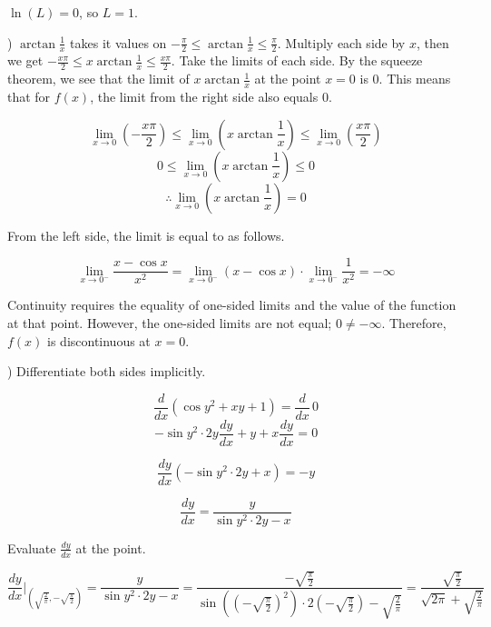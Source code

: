 \documentclass{article}
\begin{document}
\hfill

\noindent $\ln(L)= 0$, so $\boxed{L = 1}$.

\hfill

) $\displaystyle \arctan\frac1x$ takes it values on $\displaystyle -\frac{\pi}2 \leq \arctan\frac1x \leq \frac{\pi}2$. Multiply each side by $x$, then we get $\displaystyle -\frac{x\pi}2 \leq x\arctan\frac1x \leq \frac{x\pi}2$. Take the limits of each side. By the squeeze theorem, we see that the limit of $\displaystyle x\arctan\frac1x$ at the point $x=0$ is $0$. This means that for $f(x)$, the limit from the right side also equals $0$.

\[\lim_{x\to 0}\left(-\frac{x\pi}2\right)\leq\lim_{x\to 0}\left(x\arctan\frac1x\right)\leq\lim_{x\to 0}\left(\frac{x\pi}2\right)\]
\[0\leq\lim_{x\to 0}\left(x\arctan\frac1x\right)\leq0\]
\[\therefore\lim_{x\to 0}\left(x\arctan\frac1x\right) = 0\]

\hfill

\noindent From the left side, the limit is equal to as follows.

\[\lim_{x\to0^-}\frac{x-\cos x}{x^2}=\lim_{x\to0^-}(x-\cos x)\cdot\lim_{x\to0^-}\frac1{x^2} =-\infty\]

\hfill

\noindent Continuity requires the equality of one-sided limits and the value of the function at that point. However, the one-sided limits are not equal; $0\neq-\infty$. Therefore, $f(x)$ is discontinuous at $x=0$.

\hfill

) Differentiate both sides implicitly.

\[\frac{d}{dx}\left(\cos y^2 + xy +1 \right) = \frac{d}{dx} \, 0\]
\[-\sin y^2 \cdot 2y\frac{dy}{dx} + y + x\frac{dy}{dx}= 0\]

\[\frac{dy}{dx}\left(-\sin y^2 \cdot 2y + x\right)= -y\]

\begin{equation}\frac{dy}{dx}= \frac y{\sin y^2 \cdot 2y - x}\end{equation}

\hfill

\noindent Evaluate $\displaystyle \frac{dy}{dx}$ at the point.

\begin{equation}\frac{dy}{dx}\Bigg|_{\left(\sqrt{\frac{2}{\pi}}, -\sqrt{\frac{\pi}{2}} \right)} = \frac y{\sin y^2 \cdot 2y - x} = \frac{-\sqrt{\frac{\pi}{2}}}{\sin\left(\left(-\sqrt{\frac{\pi}{2}}\right)^2 \right)\cdot 2\left(-\sqrt{\frac{\pi}{2}}\right) -\sqrt{\frac{2}{\pi}}} =\frac{\sqrt{\frac{\pi}{2}}}{ \sqrt{2\pi} +\sqrt{\frac{2}{\pi}}}\end{equation}
\end{document}
